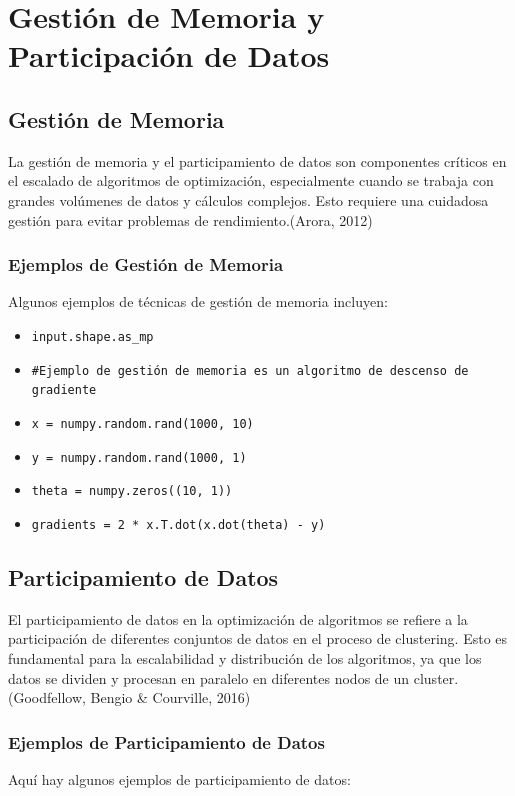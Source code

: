 	\section{Gestión de Memoria y Participación de Datos}
	
	\subsection{Gestión de Memoria}
	La gestión de memoria y el participamiento de datos son componentes críticos en el escalado de algoritmos de optimización, especialmente cuando se trabaja con grandes volúmenes de datos y cálculos complejos. Esto requiere una cuidadosa gestión para evitar problemas de rendimiento.(Arora, 2012) 
	
	\subsubsection{Ejemplos de Gestión de Memoria}
	Algunos ejemplos de técnicas de gestión de memoria incluyen:
	
	\begin{itemize}
		\item \texttt{input.shape.as\_mp}
		\item \texttt{\#Ejemplo de gestión de memoria es un algoritmo de descenso de gradiente}
		\item \texttt{x = numpy.random.rand(1000, 10)} 
		\item \texttt{y = numpy.random.rand(1000, 1)}
		\item \texttt{theta = numpy.zeros((10, 1))}
		\item \texttt{gradients = 2 * x.T.dot(x.dot(theta) - y)}
	\end{itemize}
	
	\subsection{Participamiento de Datos}
	El participamiento de datos en la optimización de algoritmos se refiere a la participación de diferentes conjuntos de datos en el proceso de clustering. Esto es fundamental para la escalabilidad y distribución de los algoritmos, ya que los datos se dividen y procesan en paralelo en diferentes nodos de un cluster.(Goodfellow, Bengio \& Courville, 2016) 
	
	\subsubsection{Ejemplos de Participamiento de Datos}
	Aquí hay algunos ejemplos de participamiento de datos:
	
